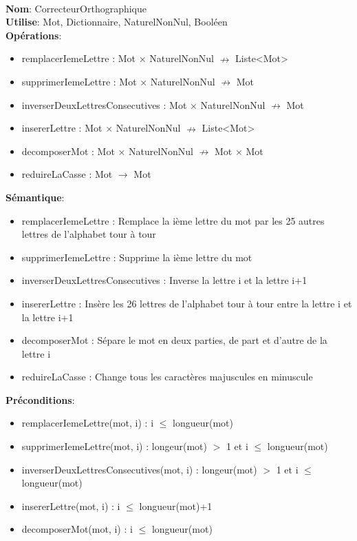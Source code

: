 \documentclass{article}
\begin{document}
    \noindent
    \\
    \textbf{Nom}: CorrecteurOrthographique \\
    \textbf{Utilise}: Mot, Dictionnaire, NaturelNonNul, Booléen\\
    \textbf{Opérations}: \begin{itemize}[label=$\ $, leftmargin=2cm, itemsep=0cm]
        \item remplacerIemeLettre : Mot $\times$ NaturelNonNul $\nrightarrow$ Liste\textless Mot\textgreater
        \item supprimerIemeLettre : Mot $\times$ NaturelNonNul $\nrightarrow$ Mot
        \item inverserDeuxLettresConsecutives : Mot $\times$ NaturelNonNul $\nrightarrow$ Mot
        \item insererLettre : Mot $\times$ NaturelNonNul $\nrightarrow$ Liste\textless Mot\textgreater
        \item decomposerMot : Mot $\times$ NaturelNonNul $\nrightarrow$ Mot $\times$ Mot
        \item reduireLaCasse : Mot $\rightarrow$ Mot
    \end{itemize}
    
    \textbf{Sémantique}: \begin{itemize}[label=$\- $, leftmargin=2cm, itemsep=0cm]
        \item remplacerIemeLettre : Remplace la ième lettre du mot par les 25 autres lettres de l'alphabet tour à tour
        \item supprimerIemeLettre : Supprime la ième lettre du mot
        \item inverserDeuxLettresConsecutives : Inverse la lettre i et la lettre i+1
        \item insererLettre : Insère les 26 lettres de l'alphabet tour à tour entre la lettre i et la lettre i+1
        \item decomposerMot : Sépare le mot en deux parties, de part et d'autre de la lettre i
        \item reduireLaCasse : Change tous les caractères majuscules en minuscule
    \end{itemize}

    \textbf{Préconditions}: \begin{itemize}[label=$\- $, leftmargin=2cm, itemsep=0cm]
        \item remplacerIemeLettre(mot, i) : i $\leq$ longueur(mot)
        \item supprimerIemeLettre(mot, i) : longeur(mot) $>$ 1 et i $\leq$ longueur(mot)
        \item inverserDeuxLettresConsecutives(mot, i) : longeur(mot) $>$ 1 et i $\leq$ longueur(mot)
        \item insererLettre(mot, i) : i $\leq$ longueur(mot)+1
        \item decomposerMot(mot, i) : i $\leq$ longueur(mot)
    \end{itemize}
\end{document}
